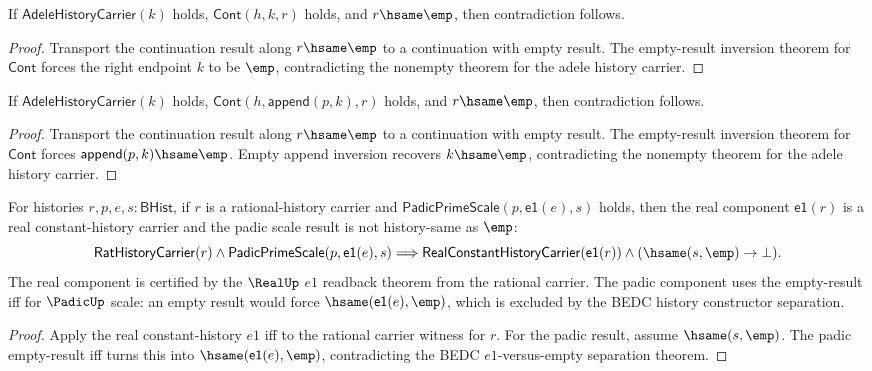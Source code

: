 \begin{theorem}
\label{thm:adele-history-carrier-cont-right-result-nonempty}
If $\mathsf{AdeleHistoryCarrier}(k)$ holds, $\mathsf{Cont}(h,k,r)$ holds, and
$r\hsame\emp$, then contradiction follows.
\end{theorem}
\begin{proof}
Transport the continuation result along $r\hsame\emp$ to a continuation with
empty result. The empty-result inversion theorem for $\mathsf{Cont}$ forces
the right endpoint $k$ to be $\emp$, contradicting the nonempty theorem for the
adele history carrier.
\end{proof}

\begin{theorem}
\label{thm:adele-history-carrier-cont-append-right-result-nonempty}
If $\mathsf{AdeleHistoryCarrier}(k)$ holds, $\mathsf{Cont}(h,\mathsf{append}(p,k),r)$
holds, and $r\hsame\emp$, then contradiction follows.
\end{theorem}
\begin{proof}
Transport the continuation result along $r\hsame\emp$ to a continuation with
empty result. The empty-result inversion theorem for $\mathsf{Cont}$ forces
$\mathsf{append}(p,k)\hsame\emp$. Empty append inversion recovers
$k\hsame\emp$, contradicting the nonempty theorem for the adele history
carrier.
\end{proof}

\begin{theorem}
\label{thm:adele-real-padic-e1-real-nonempty-scale-result-package}
For histories $r,p,e,s:\mathsf{BHist}$, if $r$ is a rational-history carrier
and $\mathsf{PadicPrimeScale}(p,\mathsf{e1}(e),s)$ holds, then the real
component $\mathsf{e1}(r)$ is a real constant-history carrier and the padic
scale result is not history-same as $\emp$:
$$
\mathsf{RatHistoryCarrier}(r)\land
\mathsf{PadicPrimeScale}(p,\mathsf{e1}(e),s)
\Longrightarrow
\mathsf{RealConstantHistoryCarrier}(\mathsf{e1}(r))\land
(\hsame(s,\emp)\to\bot).
$$
The real component is certified by the $\RealUp$ $e1$ readback theorem from
the rational carrier. The padic component uses the empty-result iff for
$\PadicUp$ scale: an empty result would force
$\hsame(\mathsf{e1}(e),\emp)$, which is excluded by the BEDC history
constructor separation.
\end{theorem}
\begin{proof}
Apply the real constant-history $e1$ iff to the rational carrier witness for
$r$. For the padic result, assume $\hsame(s,\emp)$. The padic empty-result iff
turns this into $\hsame(\mathsf{e1}(e),\emp)$, contradicting the BEDC
$e1$-versus-empty separation theorem.
\end{proof}

